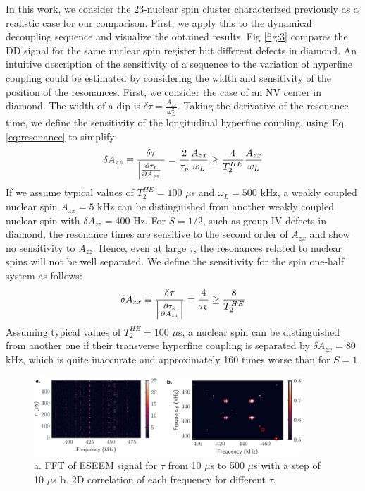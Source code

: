 \documentclass[%
 reprint,
superscriptaddress,
 amsmath,amssymb,
 aps,
]{revtex4-2}
\begin{document}
In this work, we consider the 23-nuclear spin cluster characterized previously \cite{abobeih2019atomic} as a realistic case for our comparison.
First, we apply this to the dynamical decoupling sequence and visualize the obtained results. Fig \ref{fig:3} compares the DD signal for the same nuclear spin register but different defects in diamond.
An intuitive description of the sensitivity of a sequence to the variation of hyperfine coupling could be estimated by considering the width and sensitivity of the position of the resonances.
First, we consider the case of an NV center in diamond. The width of a dip is $\delta \tau = \frac{A_{zx}}{\omega_L^2}$. Taking the derivative of the resonance time, we define the sensitivity of the longitudinal hyperfine coupling, using Eq. \ref{eq:resonance} to simplify:
\begin{gather}
	\delta A_{zz} \equiv \frac{\delta \tau}{\abs{\frac{\partial \tau_p}{\partial A_{zz}}}} = \frac{2}{\tau_p} \frac{A_{zx}}{\omega_L} \ge \frac{4}{T_2^{HE}} \frac{A_{zx}}{\omega_L}
\end{gather}
If we assume typical values of $T_2^{HE} = 100$ $\mu$s and $\omega_L=500$ kHz, a weakly coupled nuclear spin $A_{zx}=5$ kHz can be distinguished from another weakly coupled nuclear spin with $\delta A_{zz} = 400$ Hz.
For $S=1/2$, such as group IV defects in diamond, the resonance times are sensitive to the second order of $A_{zx}$ and show no sensitivity to $A_{zz}$.
Hence, even at large $\tau$, the resonances related to nuclear spins will not be well separated.
We define the sensitivity for the spin one-half system as follows:
\begin{gather}
	\delta A_{zx} \equiv \frac{\delta \tau}{\abs{\frac{\partial \tau_k}{\partial A_{zx}}}} = \frac{4}{\tau_k} \ge \frac{8}{T_2^{HE}}
\end{gather}
Assuming typical values of $T_2^{HE} = 100$ $\mu$s, a nuclear spin can be distinguished from another one if their transverse hyperfine coupling is separated by $\delta A_{zx} = 80$ kHz, which is quite inaccurate and approximately 160 times worse than for $S=1$.
\begin{figure}%
	\begin{center}
		\includegraphics[width=0.9\textwidth]{pict/fig5.png}
		\caption{a. FFT of ESEEM signal for $\tau$ from 10 $\mu$s to 500 $\mu$s with a step of 10 $\mu$s b. 2D correlation of each frequency for different $\tau$.}
		\label{fig:4}
	\end{center}
\end{figure}
\end{document}
